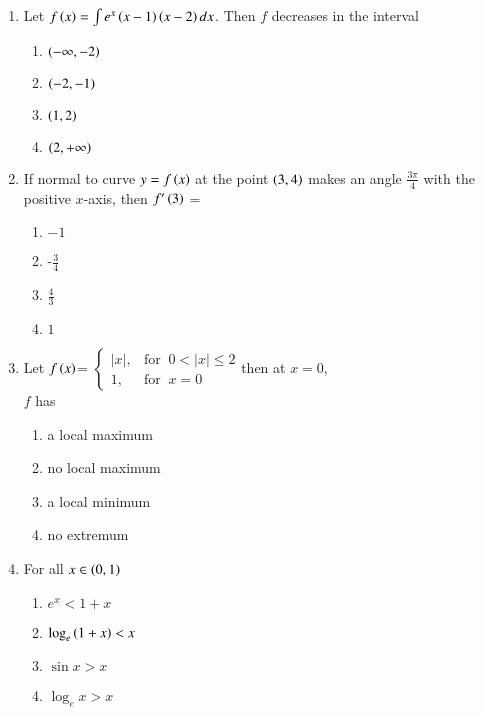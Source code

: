 \documentclass[journal]{IEEEtran}
\begin{document}
\begin{enumerate}[start=9]
\item Let $f\left(x\right)=\int e^x\left(x-1\right)\left(x-2\right)dx$. Then $f$ decreases in the interval 
\hfill {}
\begin{multicols}{3}
\begin{enumerate}
    \item $\left(-\infty,-2\right)$
    \item $\left(-2,-1\right)$
    \item $\left(1,2\right)$
    \item $\left(2,+\infty\right)$\\
\end{enumerate}
\end{multicols}
\item If normal to curve $y=f\left(x\right)$ at the point $\left(3,4\right)$ makes an angle $\frac{3\pi}{4}$ with the positive $x$-axis, then $f^{\prime}\left(3\right)$ = \hfill{}
\begin{multicols}{2}
\begin{enumerate}
    \item $-1$
    \item -$\frac{3}{4}$\\
    \item $\frac{4}{3}$
    \item $1$
\end{enumerate}
\end{multicols}
\item Let $f\left(x\right)$=
$\begin{cases}
|x|, & \text{for } \ 0<|x| \leq 2\\ 
1, & \text{for }\  x=0
\end{cases}$then at $x=0$, \\$f$ has
\hfill {}
\begin{enumerate}
    \item a local maximum
    \item no local maximum
    \item a local minimum
    \item no extremum\\
\end{enumerate}
\item For all $x\in\left(0,1\right)$
\hfill {}
\begin{enumerate}
    \item $e^{x} <1+x$
    \item $\log_e{\left(1+x\right)} < x$
    \item $ \sin{x} > x$
    \item $ \log_e{x} > x $\\

\end{enumerate}
\end{enumerate}
\end{document}
